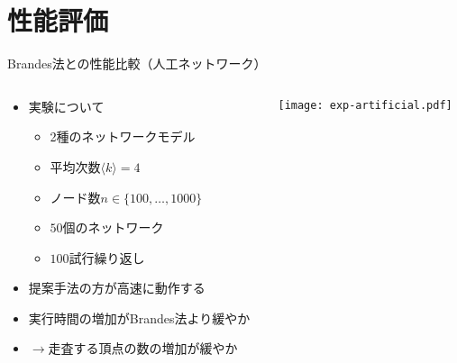 \documentclass[dvipdfmx,fleqn]{beamer}
\begin{document}
\section{性能評価}
\begin{frame}[allowframebreaks]{Brandes法との性能比較（人工ネットワーク）}
  \begin{columns}
    \begin{column}{.5\textwidth}
      \begin{itemize}
      \item 実験について
        \begin{itemize}
        \item 2種のネットワークモデル
        \item 平均次数$\langle k\rangle=4$
        \item ノード数$n\in\{100,\ldots,1000\}$
        \item $50$個のネットワーク
        \item $100$試行繰り返し
        \end{itemize}
        \medskip
      \item 提案手法の方が高速に動作する
      \item 実行時間の増加がBrandes法より緩やか
      \item[] $\rightarrow$\alert{走査する頂点の数の増加が緩やか}
      \end{itemize}
    \end{column}
    \begin{column}{.5\textwidth}
      \texttt{[image: exp-artificial.pdf]}
    \end{column}
  \end{columns}
\end{frame}
\end{document}
